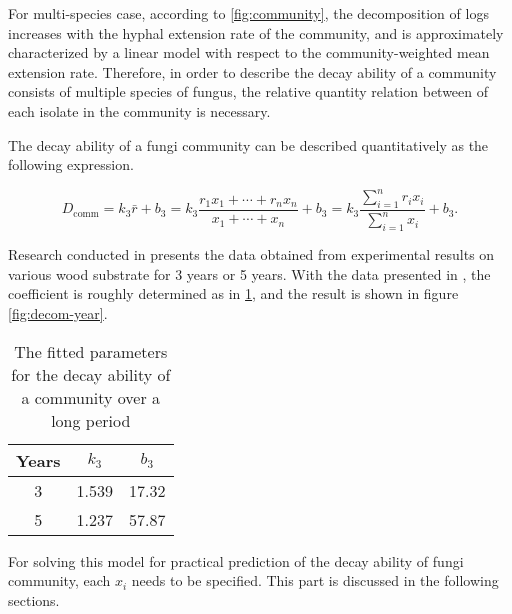 For multi-species case, according to \ref{fig:community}, the decomposition of logs increases with the hyphal extension rate of the community, and is approximately characterized by a linear model with respect to the community-weighted mean extension rate. Therefore, in order to describe the decay ability of a community consists of multiple species of fungus, the relative quantity relation between of each isolate in the community is necessary.

The decay ability of a fungi community can be described quantitatively as the following expression.

\begin{equation}\label{eq:dcomm}
    D_\text{comm} =
    k_3\bar{r} + b_3=
    k_3\frac{r_1x_1 + \cdots + r_nx_n}{x_1 + \cdots + x_n} + b_3 =
    k_3\dfrac{\sum_{i=1}^n r_ix_i}{\sum_{i=1}^n x_i} + b_3.
\end{equation}



Research conducted in \cite{Lustenshouwer} presents the data obtained from experimental results on various wood substrate for 3 years or 5 years. With the data presented in \cite{Maynard-data}, the coefficient is roughly determined as in \ref{tb:para-year}, and the result is shown in figure \ref{fig:decom-year}.

\begin{table}
    \caption{The fitted parameters for the decay ability of a community over a long period}
    \centering
    \begin{tabular}{c|cc}
        \toprule
        Years & $k_3$ & $b_3$ \\
        \midrule
        3     & 1.539 & 17.32 \\
        5     & 1.237 & 57.87 \\
        \bottomrule
    \end{tabular}\label{tb:para-year}
\end{table}

For solving this model for practical prediction of the decay ability of fungi community, each $x_i$ needs to be specified. This part is discussed in the following sections.
